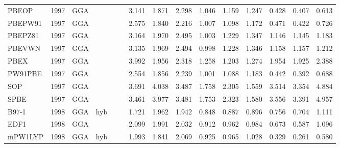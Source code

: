 \begin{landscape}
\begin{longtable}{lc:cccc:rrr:rrr:rrr}
    PBEOP            & 1997 & GGA  &          &             &           & 3.141             & 1.871             & 2.298  & 1.046              & 1.159             & 1.247  & 0.428   & 0.407 & 0.613 \\
    PBEPW91          & 1997 & GGA  &          &             &           & 2.575             & 1.840             & 2.216  & 1.007              & 1.098             & 1.172  & 0.471   & 0.422 & 0.726 \\
    PBEPZ81          & 1997 & GGA  &          &             &           & 3.164             & 1.970             & 2.495  & 1.003              & 1.229             & 1.347  & 1.146   & 1.145 & 1.183 \\
    PBEVWN           & 1997 & GGA  &          &             &           & 3.135             & 1.969             & 2.494  & 0.998              & 1.228             & 1.346  & 1.158   & 1.157 & 1.212 \\
    PBEX             & 1997 & GGA  &          &             &           & 3.992             & 1.956             & 2.318  & 1.258              & 1.203             & 1.274  & 1.954   & 1.925 & 2.388 \\
    PW91PBE          & 1997 & GGA  &          &             &           & 2.554             & 1.856             & 2.239  & 1.001              & 1.088             & 1.183  & 0.442   & 0.392 & 0.688 \\
    SOP              & 1997 & GGA  &          &             &           & 3.691             & 4.038             & 3.487  & 1.758              & 2.305             & 1.559  & 3.514   & 3.354 & 4.884 \\
    SPBE             & 1997 & GGA  &          &             &           & 3.461             & 3.977             & 3.481  & 1.753              & 2.323             & 1.580  & 3.556   & 3.391 & 4.957 \\
    B97-1            & 1998 & GGA  & hyb      &             &           & 1.721             & 1.962             & 1.942  & 0.848              & 0.887             & 0.896  & 0.756   & 0.704 & 1.111 \\
    EDF1             & 1998 & GGA  &          &             &           & 2.099             & 1.991             & 2.032  & 0.912              & 0.962             & 0.984  & 0.673   & 0.587 & 1.096 \\
    mPW1LYP          & 1998 & GGA  & hyb      &             &           & 1.993             & 1.841             & 2.069  & 0.925              & 0.965             & 1.028  & 0.329   & 0.261 & 0.580 \\

\end{longtable}
\end{landscape}

